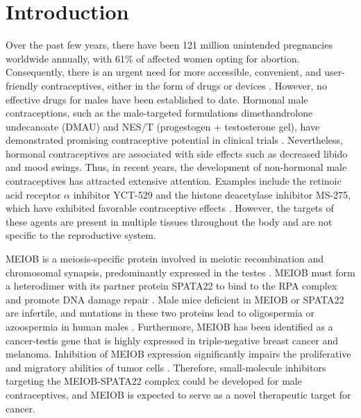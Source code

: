 \documentclass[preprint,12pt]{elsarticle}
\theoremstyle{plain}
\theoremstyle{definition}
\theoremstyle{remark}
\begin{document}


\section*{Introduction}

Over the past few years, there have been 121 million unintended pregnancies worldwide annually, with 61\% of affected women opting for abortion. Consequently, there is an urgent need for more accessible, convenient, and user-friendly contraceptives, either in the form of drugs or devices \cite{1}. However, no effective drugs for males have been established to date. Hormonal male contraceptions, such as the male-targeted formulations dimethandrolone undecanoate (DMAU) and NES/T (progestogen + testosterone gel), have demonstrated promising contraceptive potential in clinical trials \cite{2,3}. Nevertheless, hormonal contraceptives are associated with side effects such as decreased libido and mood swings. Thus, in recent years, the development of non-hormonal male contraceptives has attracted extensive attention. Examples include the retinoic acid receptor $\alpha$ inhibitor YCT-529 and the histone deacetylase inhibitor MS-275, which have exhibited favorable contraceptive effects \cite{4,5}. However, the targets of these agents are present in multiple tissues throughout the body and are not specific to the reproductive system.

MEIOB is a meiosis-specific protein involved in meiotic recombination and chromosomal synapsis, predominantly expressed in the testes \cite{6,7}. MEIOB must form a heterodimer with its partner protein SPATA22 to bind to the RPA complex and promote DNA damage repair \cite{8,9,10,11}. Male mice deficient in MEIOB or SPATA22 are infertile, and mutations in these two proteins lead to oligospermia or azoospermia in human males \cite{12,13,14,15,16,17}. Furthermore, MEIOB has been identified as a cancer-testis gene that is highly expressed in triple-negative breast cancer and melanoma. Inhibition of MEIOB expression significantly impairs the proliferative and migratory abilities of tumor cells \cite{18,19,20}. Therefore, small-molecule inhibitors targeting the MEIOB-SPATA22 complex could be developed for male contraceptives, and MEIOB is expected to serve as a novel therapeutic target for cancer.
\end{document}
